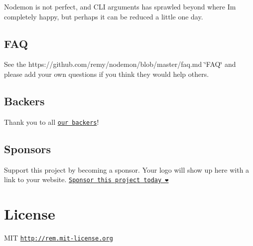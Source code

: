 Nodemon is not perfect, and C\+LI arguments has sprawled beyond where I\textquotesingle{}m completely happy, but perhaps it can be reduced a little one day.

\subsection*{F\+AQ}

See the https\+://github.com/remy/nodemon/blob/master/faq.\+md \char`\"{}\+F\+A\+Q\char`\"{} and please add your own questions if you think they would help others.

\subsection*{Backers}

Thank you to all \href{https://opencollective.com/nodemon#backer}{\tt our backers}! 🙏

\href{https://opencollective.com/nodemon#backers}{\tt }

\subsection*{Sponsors}

Support this project by becoming a sponsor. Your logo will show up here with a link to your website. \href{https://opencollective.com/nodemon#sponsor}{\tt Sponsor this project today ❤️}

\href{https://sparkpo.st/nodemon}{\tt }

\href{https://mixmax.com}{\tt }

\section*{License}

M\+IT \href{http://rem.mit-license.org}{\tt http\+://rem.\+mit-\/license.\+org} 